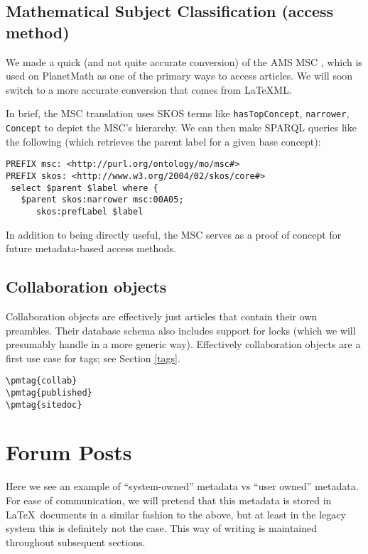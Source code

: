 \documentclass{article}
\begin{document}
\subsection{Mathematical Subject Classification (access method)}

We made a quick (and not quite accurate conversion) of the
AMS MSC \cite{MSC2000}, which is used on PlanetMath as one
of the primary ways to access articles.  We will soon
switch to a more accurate conversion that comes from
\LaTeX ML.

In brief, the MSC translation uses SKOS terms like
\verb|hasTopConcept|, \verb|narrower|, \verb|Concept| to
depict the MSC's hierarchy.  We can then make SPARQL
queries like the following (which retrieves the parent
label for a given base concept):

\begin{verbatim}
PREFIX msc: <http://purl.org/ontology/mo/msc#>
PREFIX skos: <http://www.w3.org/2004/02/skos/core#>
 select $parent $label where {
   $parent skos:narrower msc:00A05;
      skos:prefLabel $label
\end{verbatim}

In addition to being directly useful, the MSC serves as a
proof of concept for future metadata-based access methods.

\subsection{Collaboration objects} \label{collab}

Collaboration objects are effectively just articles that
contain their own preambles.  Their database schema also
includes support for locks (which we will presumably
handle in a more generic way).  Effectively collaboration
objects are a first use case for tags; see Section
\ref{tags}.

\begin{verbatim}
\pmtag{collab}
\pmtag{published}
\pmtag{sitedoc}
\end{verbatim}

\section{Forum Posts}

Here we see an example of ``system-owned'' metadata vs
``user owned'' metadata.  For ease of communication, we
will pretend that this metadata is stored in
\LaTeX\ documents in a similar fashion to the above, but
at least in the legacy system this is definitely not the
case.  This way of writing is maintained throughout
subsequent sections.
\end{document}

